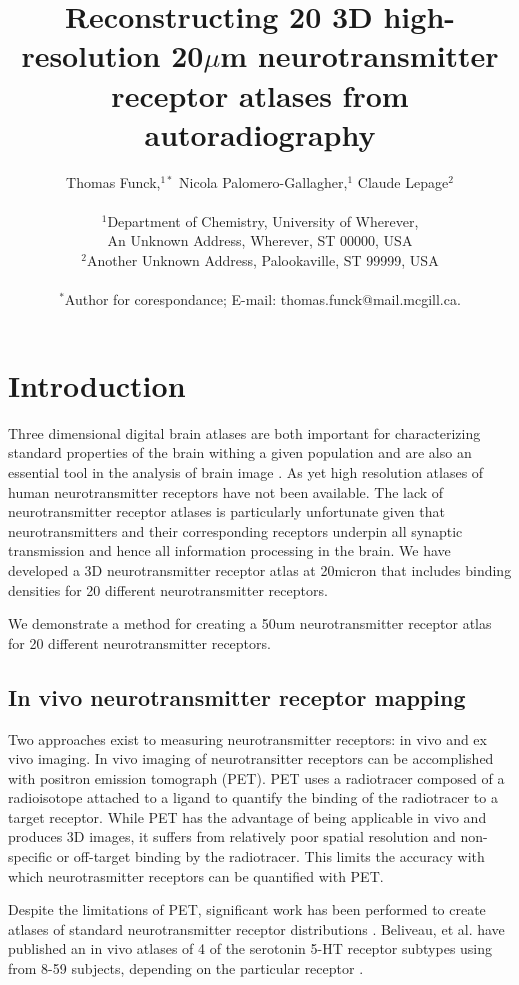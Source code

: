 \documentclass[12pt]{article}
\title{Reconstructing 20 3D high-resolution 20$\mu$m neurotransmitter receptor atlases from autoradiography}
\author{Thomas Funck,$^{1\ast}$ Nicola Palomero-Gallagher,$^{1}$ Claude Lepage$^{2}$\\
\\
\normalsize{$^{1}$Department of Chemistry, University of Wherever,}\\
\normalsize{An Unknown Address, Wherever, ST 00000, USA}\\
\normalsize{$^{2}$Another Unknown Address, Palookaville, ST 99999, USA}\\
\\
\normalsize{$^\ast$Author for corespondance; E-mail:  thomas.funck@mail.mcgill.ca.}
}
\date{}
\begin{document}
 

\baselineskip24pt
\maketitle 


\section{Introduction}

Three dimensional digital brain atlases are both important for characterizing standard properties of the brain withing a given population and are also an essential tool in the analysis of brain image
\cite{Toga2006}. As yet high resolution atlases of human neurotransmitter receptors have not been available. The lack of neurotransmitter receptor atlases is particularly unfortunate given that neurotransmitters and their corresponding receptors underpin all synaptic transmission and hence all information processing in the brain. We have developed a 3D neurotransmitter receptor atlas at 20micron that includes binding densities for 20 different neurotransmitter receptors. 

We demonstrate a method for creating a 50um neurotransmitter receptor atlas for 20 different neurotransmitter receptors.

\subsection{In vivo neurotransmitter receptor mapping}
Two approaches exist to measuring neurotransmitter receptors: in vivo and ex vivo imaging. In vivo imaging of neurotransitter receptors can be accomplished with positron emission tomograph (PET). PET uses a radiotracer composed of a radioisotope attached to a ligand to quantify the binding of the radiotracer to a target receptor. While PET has the advantage of being applicable in vivo and produces 3D images, it suffers from relatively poor spatial resolution and non-specific or off-target binding by the radiotracer. This limits the accuracy with which neurotrasmitter receptors can be quantified with PET.

Despite the limitations of PET, significant work has been performed to create atlases of standard neurotransmitter receptor distributions \cite{Savli2012,Beliveau2017}. Beliveau, et al. have published an in vivo atlases of 4 of the serotonin 5-HT receptor subtypes using from 8-59 subjects, depending on the particular receptor \cite{Beliveau2017}. 
\end{document}
